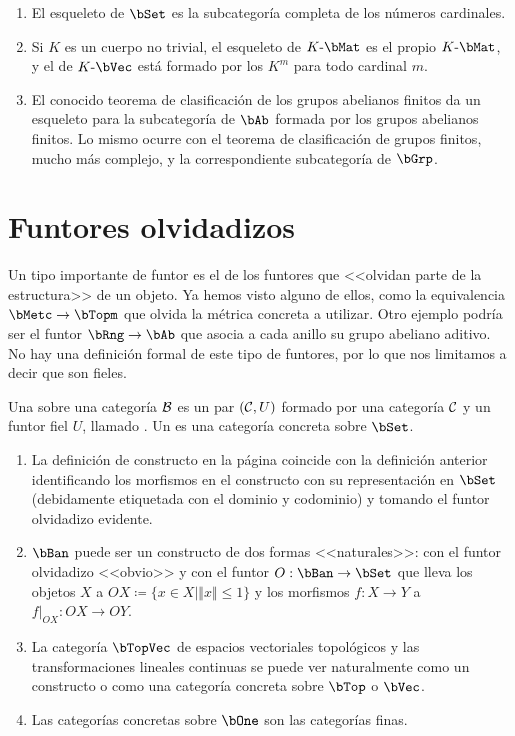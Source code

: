 \begin{example}\;
  \begin{enumerate}
  \item El esqueleto de $\bSet$ es la subcategoría completa de los números cardinales.
  \item Si $K$ es un cuerpo no trivial, el esqueleto de $K\dash\bMat$
    es el propio $K\dash\bMat$, y el de $K\dash\bVec$ está formado por
    los $K^m$ para todo cardinal $m$.
  \item El conocido teorema de clasificación de los grupos abelianos
    finitos da un esqueleto para la subcategoría de $\bAb$ formada por
    los grupos abelianos finitos. Lo mismo ocurre con el teorema de
    clasificación de grupos finitos, mucho más complejo, y la
    correspondiente subcategoría de $\bGrp$.
  \end{enumerate}
\end{example}

\section{Funtores olvidadizos}

Un tipo importante de funtor es el de los funtores que <<olvidan parte
de la estructura>> de un objeto. Ya hemos visto alguno de ellos, como
la equivalencia $\bMetc\to\bTopm$ que olvida la métrica concreta a
utilizar. Otro ejemplo podría ser el funtor $\bRng\to\bAb$ que asocia
a cada anillo su grupo abeliano aditivo. No hay una definición formal
de este tipo de funtores, por lo que nos limitamos a decir que son
fieles.

\begin{definition}
  Una  sobre una categoría $\mathcal{B}$ es un par
  $(\mathcal{C},U)$ formado por una categoría $\mathcal{C}$ y un funtor fiel $U$,
  llamado . Un  es una
  categoría concreta sobre $\bSet$.
\end{definition}

\begin{example}\;
  \begin{enumerate}
  \item La definición de constructo en la página
    \pageref{sec:cat-abstract} coincide con la definición anterior
    identificando los morfismos en el constructo con su representación
    en $\bSet$ (debidamente etiquetada con el dominio y codominio) y
    tomando el funtor olvidadizo evidente.
  \item $\bBan$ puede ser un constructo de dos formas <<naturales>>:
    con el funtor olvidadizo <<obvio>> y con el funtor
    $O:\bBan\to\bSet$ que lleva los objetos $X$ a
    $OX\coloneqq\{x\in X\mid\Vert x\Vert\leq1\}$ y los morfismos
    $f:X\to Y$ a $f|_{OX}:OX\to OY$.
  \item La categoría $\bTopVec$ de espacios vectoriales topológicos y
    las transformaciones lineales continuas se puede ver naturalmente
    como un constructo o como una categoría concreta sobre $\bTop$ o
    $\bVec$.
  \item Las categorías concretas sobre $\bOne$ son las categorías
    finas.
  \end{enumerate}
\end{example}

